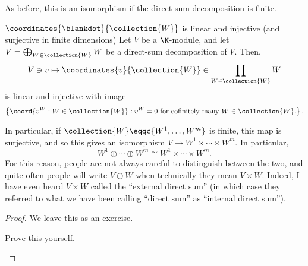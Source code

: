 As before, this is an isomorphism if the direct-sum decomposition is finite.
\begin{prp}{$\coordinates{\blankdot}{\collection{W}}$ is linear and injective (and surjective in finite dimensions)}{}
	Let $V$ be a $\K$-module, and let $V=\bigoplus _{W\in \collection{W}}W$ be a direct-sum decomposition of $V$.  Then,
	\begin{equation}
		V\ni v\mapsto \coordinates{v}{\collection{W}}\in \prod _{W\in \collection{W}}W
	\end{equation}
	is linear and injective with image
	\begin{equation}
		\left\{ \coord{v^W:W\in \collection{W}}:v^W=0\text{ for cofinitely many }W\in \collection{W}\text{.}\right\} .
	\end{equation}
	\begin{rmk}
		In particular, if $\collection{W}\eqqc \{ W^1,\ldots ,W^m\}$ is finite, this map is surjective, and so this gives an isomorphism $V\rightarrow W^1\times \cdots \times W^m$.  In particular,
		\begin{equation}
			W^1\oplus \cdots \oplus W^m\cong W^1\times \cdots \times W^m.
		\end{equation}
		For this reason, people are not always careful to distinguish between the two, and quite often people will write $V\oplus W$ when technically they mean $V\times W$.  Indeed, I have even heard $V\times W$ called the ``external direct sum'' (in which case they referred to what we have been calling ``direct sum'' as ``internal direct sum'').
	\end{rmk}
	\begin{proof}
		We leave this as an exercise.
		\begin{exr}[breakable=false]{}{}
			Prove this yourself.
		\end{exr}
	\end{proof}
\end{prp}

